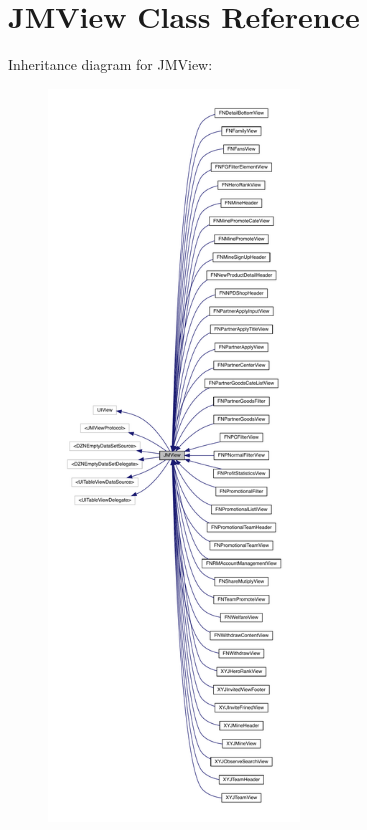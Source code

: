\hypertarget{interface_j_m_view}{}\section{J\+M\+View Class Reference}
\label{interface_j_m_view}


Inheritance diagram for J\+M\+View\+:\nopagebreak
\begin{figure}[H]
\begin{center}
\leavevmode
\includegraphics[height=550pt]{interface_j_m_view__inherit__graph}
\end{center}
\end{figure}


